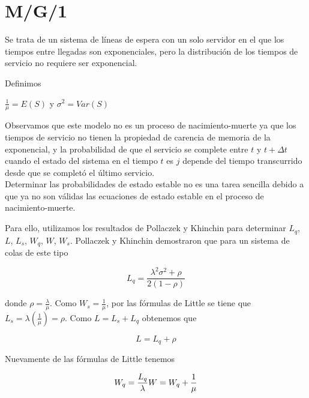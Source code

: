 
\section{M/G/1}


Se trata de un sistema de líneas de espera con un solo servidor en el que los tiempos entre llegadas son exponenciales, pero la distribución de los tiempos de servicio no requiere ser exponencial.

Definimos

\begin{center}
$\frac{1}{\mu}=E(S)$ y   $\sigma^2= Var(S)$
\end{center}

Observamos que este modelo no es un proceso de nacimiento-muerte ya que los tiempos de servicio no tienen la propiedad de carencia de memoria de la exponencial, y la probabilidad de que el servicio se complete entre $t$ y $t + \Delta t$ cuando el estado del sistema en el tiempo $t$ es $j$ depende del tiempo transcurrido desde que se completó el último servicio.\\

Determinar las probabilidades de estado estable no es una tarea sencilla debido a que ya no son válidas las ecuaciones de estado estable en el proceso de nacimiento-muerte.

Para ello, utilizamos los resultados de Pollaczek y Khinchin para determinar $L_q$, $L$, $L_s$, $W_q$, $W$, $W_s$. Pollaczek y Khinchin demostraron que para un sistema de colas de este tipo

\begin{equation}
L_q=\frac{\lambda^2 \sigma^2+\rho}{2(1-\rho)}
\end{equation}

donde $\rho=\displaystyle\frac{\lambda}{\mu}$. Como $W_s=\displaystyle\frac{1}{\mu}$, por las fórmulas de Little se tiene que $L_s=\lambda\left(\displaystyle\frac{1}{\mu}\right)=\rho$. Como $L=L_s+L_q$ obtenemos que

\begin{equation}
L=L_q+\rho
\end{equation}

Nuevamente de las fórmulas de Little tenemos

\begin{equation}
W_q=\frac{L_q}{\lambda}\\
W=W_q+\frac{1}{\mu}
\end{equation}

